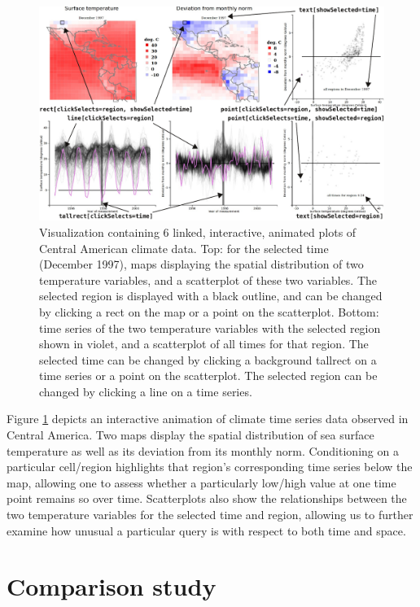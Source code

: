 \documentclass[12pt,]{article}
\theoremstyle{definition}
\theoremstyle{definition}
\theoremstyle{definition}
\theoremstyle{remark}
\begin{document}
\begin{figure}
\centering
\includegraphics{images/figure-climate}
\caption{\label{fig:climate}Visualization containing 6 linked, interactive,
animated plots of Central American climate data. Top: for the selected
time (December 1997), maps displaying the spatial distribution of two
temperature variables, and a scatterplot of these two variables. The
selected region is displayed with a black outline, and can be changed by
clicking a rect on the map or a point on the scatterplot. Bottom: time
series of the two temperature variables with the selected region shown
in violet, and a scatterplot of all times for that region. The selected
time can be changed by clicking a background tallrect on a time series
or a point on the scatterplot. The selected region can be changed by
clicking a line on a time series.}
\end{figure}

Figure \ref{fig:climate} depicts an interactive animation of climate
time series data observed in Central America. Two maps display the
spatial distribution of sea surface temperature as well as its deviation
from its monthly norm. Conditioning on a particular cell/region
highlights that region's corresponding time series below the map,
allowing one to assess whether a particularly low/high value at one time
point remains so over time. Scatterplots also show the relationships
between the two temperature variables for the selected time and region,
allowing us to further examine how unusual a particular query is with
respect to both time and space.

\hypertarget{compare}{%
\section{Comparison study}\label{compare}}
\end{document}
